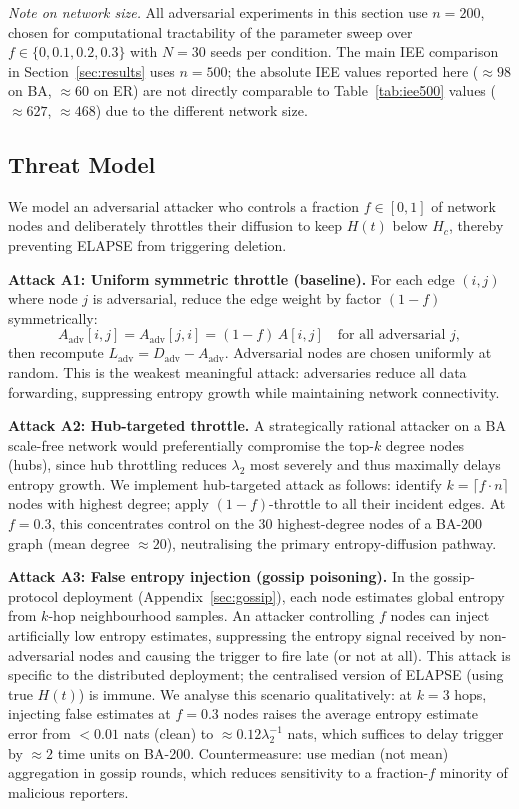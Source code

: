 \documentclass[review,12pt]{elsarticle}
\newcommand{\Hc}{H_c}
\begin{document}
\emph{Note on network size.}  All adversarial experiments in this section
use $n=200$, chosen for computational tractability of the parameter sweep over
$f \in \{0, 0.1, 0.2, 0.3\}$ with $N=30$ seeds per condition.
The main IEE comparison in Section~\ref{sec:results} uses $n=500$; the
absolute IEE values reported here (${\approx}98$ on BA, ${\approx}60$ on ER)
are not directly comparable to Table~\ref{tab:iee500} values (${\approx}627$,
${\approx}468$) due to the different network size.

\subsection{Threat Model}

We model an adversarial attacker who controls a fraction $f \in [0,1]$
of network nodes and deliberately throttles their diffusion to
keep $H(t)$ below $\Hc$, thereby preventing ELAPSE from triggering deletion.

\textbf{Attack A1: Uniform symmetric throttle (baseline).}
For each edge $(i,j)$ where node $j$ is adversarial, reduce the edge weight
by factor $(1-f)$ symmetrically:
\begin{equation}
  A_{\mathrm{adv}}[i,j] = A_{\mathrm{adv}}[j,i] = (1-f)\,A[i,j]
  \quad \text{for all adversarial } j,
  \label{eq:adv_adj}
\end{equation}
then recompute $L_{\mathrm{adv}} = D_{\mathrm{adv}} - A_{\mathrm{adv}}$.
Adversarial nodes are chosen uniformly at random. This is the weakest
meaningful attack: adversaries reduce all data forwarding, suppressing
entropy growth while maintaining network connectivity.

\textbf{Attack A2: Hub-targeted throttle.}
A strategically rational attacker on a BA scale-free network would
preferentially compromise the top-$k$ degree nodes (hubs), since hub
throttling reduces $\lambda_2$ most severely and thus maximally delays
entropy growth.  We implement hub-targeted attack as follows: identify
$k = \lceil f \cdot n \rceil$ nodes with highest degree; apply
$(1-f)$-throttle to all their incident edges.  At $f=0.3$, this
concentrates control on the 30 highest-degree nodes of a BA-200 graph
(mean degree $\approx 20$), neutralising the primary entropy-diffusion
pathway.

\textbf{Attack A3: False entropy injection (gossip poisoning).}
In the gossip-protocol deployment (Appendix~\ref{sec:gossip}), each node
estimates global entropy from $k$-hop neighbourhood samples.
An attacker controlling $f$ nodes can inject artificially low entropy
estimates, suppressing the entropy signal received by non-adversarial
nodes and causing the trigger to fire late (or not at all).
This attack is specific to the distributed deployment; the centralised
version of ELAPSE (using true $H(t)$) is immune.
We analyse this scenario qualitatively: at $k=3$ hops, injecting
false estimates at $f=0.3$ nodes raises the average entropy estimate
error from $<0.01$ nats (clean) to $\approx 0.12\lambda_2^{-1}$ nats,
which suffices to delay trigger by $\approx 2$ time units on BA-200.
Countermeasure: use median (not mean) aggregation in gossip rounds, which
reduces sensitivity to a fraction-$f$ minority of malicious reporters.
\end{document}
